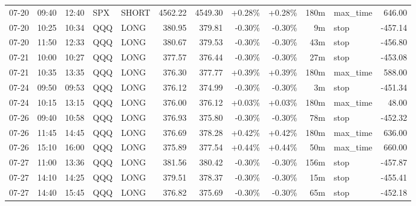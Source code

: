 \documentclass[11pt,a4paper,twoside]{article}
\begin{document}
\begin{center}
\begin{longtable}{>{\color{txtmain}}l l l l l r r r r r >{\color{txtmain}}l r}
07-20 & 09:40 & 12:40 & SPX & SHORT & 4562.22 & 4549.30 & \textcolor{wingreen}{+0.28\%} & \textcolor{wingreen}{+0.28\%} & 180m & max\_time & \textcolor{wingreen}{646.00} \\
07-20 & 10:25 & 10:34 & QQQ & LONG & 380.95 & 379.81 & \textcolor{lossred}{-0.30\%} & \textcolor{lossred}{-0.30\%} & 9m & stop & \textcolor{lossred}{-457.14} \\
07-20 & 11:50 & 12:33 & QQQ & LONG & 380.67 & 379.53 & \textcolor{lossred}{-0.30\%} & \textcolor{lossred}{-0.30\%} & 43m & stop & \textcolor{lossred}{-456.80} \\
07-21 & 10:00 & 10:27 & QQQ & LONG & 377.57 & 376.44 & \textcolor{lossred}{-0.30\%} & \textcolor{lossred}{-0.30\%} & 27m & stop & \textcolor{lossred}{-453.08} \\
07-21 & 10:35 & 13:35 & QQQ & LONG & 376.30 & 377.77 & \textcolor{wingreen}{+0.39\%} & \textcolor{wingreen}{+0.39\%} & 180m & max\_time & \textcolor{wingreen}{588.00} \\
07-24 & 09:50 & 09:53 & QQQ & LONG & 376.12 & 374.99 & \textcolor{lossred}{-0.30\%} & \textcolor{lossred}{-0.30\%} & 3m & stop & \textcolor{lossred}{-451.34} \\
07-24 & 10:15 & 13:15 & QQQ & LONG & 376.00 & 376.12 & \textcolor{wingreen}{+0.03\%} & \textcolor{wingreen}{+0.03\%} & 180m & max\_time & \textcolor{wingreen}{48.00} \\
07-26 & 09:40 & 10:58 & QQQ & LONG & 376.93 & 375.80 & \textcolor{lossred}{-0.30\%} & \textcolor{lossred}{-0.30\%} & 78m & stop & \textcolor{lossred}{-452.32} \\
07-26 & 11:45 & 14:45 & QQQ & LONG & 376.69 & 378.28 & \textcolor{wingreen}{+0.42\%} & \textcolor{wingreen}{+0.42\%} & 180m & max\_time & \textcolor{wingreen}{636.00} \\
07-26 & 15:10 & 16:00 & QQQ & LONG & 375.89 & 377.54 & \textcolor{wingreen}{+0.44\%} & \textcolor{wingreen}{+0.44\%} & 50m & max\_time & \textcolor{wingreen}{660.00} \\
07-27 & 11:00 & 13:36 & QQQ & LONG & 381.56 & 380.42 & \textcolor{lossred}{-0.30\%} & \textcolor{lossred}{-0.30\%} & 156m & stop & \textcolor{lossred}{-457.87} \\
07-27 & 14:10 & 14:25 & QQQ & LONG & 379.51 & 378.37 & \textcolor{lossred}{-0.30\%} & \textcolor{lossred}{-0.30\%} & 15m & stop & \textcolor{lossred}{-455.41} \\
07-27 & 14:40 & 15:45 & QQQ & LONG & 376.82 & 375.69 & \textcolor{lossred}{-0.30\%} & \textcolor{lossred}{-0.30\%} & 65m & stop & \textcolor{lossred}{-452.18} \\

\end{longtable}
\end{center}
\end{document}
